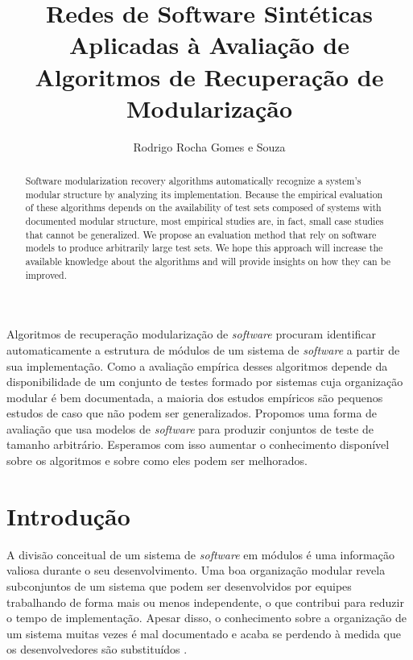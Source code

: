 \documentclass[12pt]{article}
\title{Redes de Software Sintéticas Aplicadas à Avaliação de Algoritmos de
Recuperação de Modularização}
\author{Rodrigo Rocha Gomes e Souza\inst{1}
}
\begin{document}
 

\maketitle

\begin{abstract} 

Software modularization recovery algorithms automatically recognize a system's
modular structure by analyzing its implementation. Because the empirical
evaluation of these algorithms depends on the availability of test sets composed
of systems with documented modular structure, most empirical studies are, in
fact, small case studies that cannot be generalized. We propose an evaluation
method that rely on software models to produce arbitrarily large test sets. We
hope this approach will increase the available knowledge about the algorithms
and will provide insights on how they can be improved.

\end{abstract}
     
\begin{resumo} 

Algoritmos de recuperação modularização de \emph{software} procuram identificar
automaticamente a estrutura de módulos de um sistema de \emph{software} a partir
de sua implementação. Como a avaliação empírica desses algoritmos depende da
disponibilidade de um conjunto de testes formado por sistemas cuja organização
modular é bem documentada, a maioria dos estudos empíricos são pequenos estudos
de caso que não podem ser generalizados.  Propomos uma forma de avaliação que
usa modelos de \emph{software} para produzir conjuntos de teste de tamanho
arbitrário.  Esperamos com isso aumentar o conhecimento disponível sobre os
algoritmos e sobre como eles podem ser melhorados.

\end{resumo}

\section{Introdução}

A divisão conceitual de um sistema de \emph{software} em módulos é uma
informação valiosa durante o seu desenvolvimento. Uma boa organização modular
revela subconjuntos de um sistema que podem ser desenvolvidos por equipes
trabalhando de forma mais ou menos independente, o que contribui para reduzir o
tempo de implementação. Apesar disso, o conhecimento sobre a organização de um
sistema muitas vezes é mal documentado e acaba se perdendo à medida que os
desenvolvedores são substituídos \cite{Clements2002}. %
\end{document}
